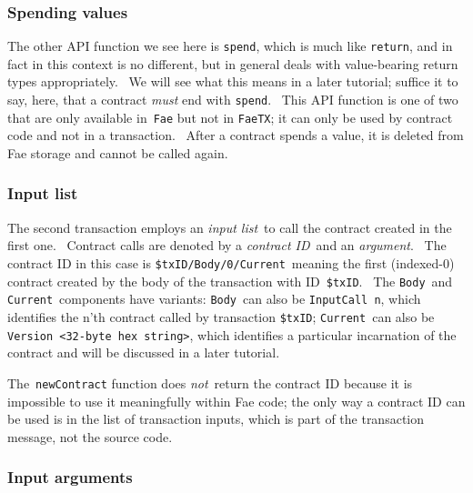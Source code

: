 \documentclass[11pt]{article}
\begin{document}
\subsubsection{Spending values}
\vspace{5.5pt}

The other API function we see here is \texttt{spend}, which is much like \texttt{return}, and in fact in this context is no different, but in general deals with value-bearing return types appropriately.  We will see what this means in a later tutorial; suffice it to say, here, that a contract \textit{must} end with \texttt{spend}.  This API function is one of two that are only available in \texttt{Fae} but not in \texttt{FaeTX}; it can only be used by contract code and not in a transaction.  After a contract spends a value, it is deleted from Fae storage and cannot be called again.

\subsubsection{Input list}
\vspace{5.5pt}

The second transaction employs an \textit{input list} to call the contract created in the first one.  Contract calls are denoted by a \textit{contract ID} and an \textit{argument}.  The contract ID in this case is \texttt{\$txID\slash{}Body\slash{}0\slash{}Current} meaning the first (indexed-0) contract created by the body of the transaction with ID \texttt{\$txID}.  The \texttt{Body} and \texttt{Current} components have variants: \texttt{Body} can also be \texttt{InputCall n}, which identifies the n'th contract called by transaction \texttt{\$txID}; \texttt{Current} can also be \texttt{Version }\texttt{\textless{}}\texttt{32-byte hex string}\texttt{\textgreater{}}, which identifies a particular incarnation of the contract and will be discussed in a later tutorial.


\vspace{11pt}

The \texttt{newContract} function does \textit{not} return the contract ID because it is impossible to use it meaningfully within Fae code; the only way a contract ID can be used is in the list of transaction inputs, which is part of the transaction message, not the source code.

\subsubsection{Input arguments}
\vspace{5.5pt}
\end{document}
